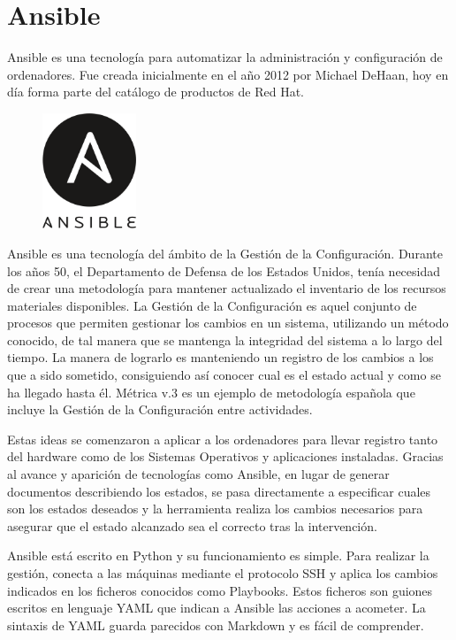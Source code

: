 \section{Ansible}


Ansible es una tecnología para automatizar la administración y configuración de ordenadores. Fue creada inicialmente en el año 2012 por Michael DeHaan, hoy en día forma parte del catálogo de productos de Red Hat.

\begin{figure}
    \centering
    \includegraphics[width=0.25\textwidth]{imaxes/e-fundamentos-tecnologicos/logo-ansible.png}
\end{figure}

Ansible es una tecnología del ámbito de la Gestión de la Configuración. Durante los años 50, el Departamento de Defensa de los Estados Unidos, tenía necesidad de crear una metodología para mantener actualizado el inventario de los recursos materiales disponibles. La Gestión de la Configuración es aquel conjunto de procesos que permiten gestionar los cambios en un sistema, utilizando un método conocido, de tal manera que se mantenga la integridad del sistema a lo largo del tiempo. La manera de lograrlo es manteniendo un registro de los cambios a los que a sido sometido, consiguiendo así conocer cual es el estado actual y como se ha llegado hasta él. Métrica v.3 es un ejemplo de metodología española que incluye la Gestión de la Configuración entre actividades.

Estas ideas se comenzaron a aplicar a los ordenadores para llevar registro tanto del hardware como de los Sistemas Operativos y aplicaciones instaladas. Gracias al avance y aparición de tecnologías como Ansible, en lugar de generar documentos describiendo los estados, se pasa directamente a especificar cuales son los estados deseados y la herramienta realiza los cambios necesarios para asegurar que el estado alcanzado sea el correcto tras la intervención.

Ansible está escrito en Python y su funcionamiento es simple. Para realizar la gestión, conecta a las máquinas mediante el protocolo SSH y aplica los cambios indicados en los ficheros conocidos como Playbooks. Estos ficheros son guiones escritos en lenguaje YAML que indican a Ansible las acciones a acometer. La sintaxis de YAML guarda parecidos con Markdown y es fácil de comprender.

